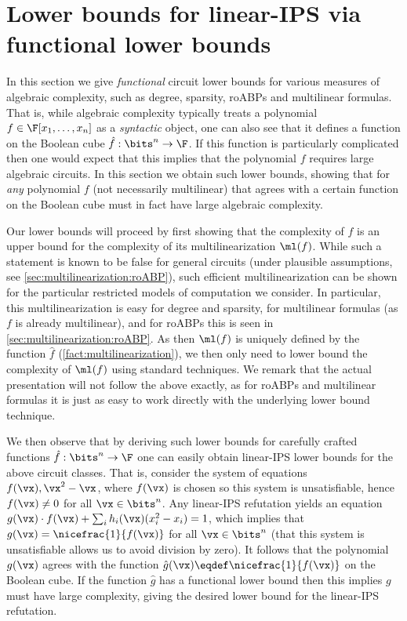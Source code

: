 \documentclass[11pt]{article}
\numberwithin{equation}{section}
\theoremstyle{definition}
\theoremstyle{plain}
\begin{document}
\section{Lower bounds for linear-IPS via functional lower bounds}\label{sec:lbs-fn}

In this section we give \emph{functional} circuit lower bounds for various measures of algebraic complexity, such as degree, sparsity, roABPs and multilinear formulas.  That is, while algebraic complexity typically treats a polynomial $f\in\F[x_1,\ldots,x_n]$ as a \emph{syntactic} object, one can also see that it defines a function on the Boolean cube $\hat{f}:\bits^n\to\F$.  If this function is particularly complicated then one would expect that this implies that the polynomial $f$ requires large algebraic circuits. In this section we obtain such lower bounds, showing that for \emph{any} polynomial $f$ (not necessarily multilinear) that agrees with a certain function on the Boolean cube must in fact have large algebraic complexity.

Our lower bounds will proceed by first showing that the complexity of $f$ is an upper bound for the complexity of its multilinearization $\ml(f)$.  While such a statement is known to be false for general circuits (under plausible assumptions, see \autoref{sec:multilinearization:roABP}), such efficient multilinearization can be shown for the particular restricted models of computation we consider.  In particular, this multilinearization is easy for degree and sparsity, for multilinear formulas (as $f$ is already multilinear), and for roABPs this is seen in \autoref{sec:multilinearization:roABP}.  As then $\ml(f)$ is uniquely defined by the function $\hat{f}$ (\autoref{fact:multilinearization}), we then only need to lower bound the complexity of $\ml(f)$ using standard techniques.  We remark that the actual presentation will not follow the above exactly, as for roABPs and multilinear formulas it is just as easy to work directly with the underlying lower bound technique.

We then observe that by deriving such lower bounds for carefully crafted functions $\hat{f}:\bits^n\to\F$ one can easily obtain linear-IPS lower bounds for the above circuit classes. That is, consider the system of equations $f(\vx),\vx^2-\vx$, where $f(\vx)$ is chosen so this system is unsatisfiable, hence $f(\vx)\ne0$ for all $\vx\in\bits^n$.  Any linear-IPS refutation yields an equation $g(\vx)\cdot f(\vx)+\sum_i h_i(\vx)(x_i^2-x_i)=1$, which implies that $g(\vx)=\nicefrac{1}{f(\vx)}$ for all $\vx\in\bits^n$ (that this system is unsatisfiable allows us to avoid division by zero). It follows that the polynomial $g(\vx)$ agrees with the function $\hat{g}(\vx)\eqdef \nicefrac{1}{f(\vx)}$ on the Boolean cube. If the function $\hat{g}$ has a functional lower bound then this implies $g$ must have large complexity, giving the desired lower bound for the linear-IPS refutation.
\end{document}

